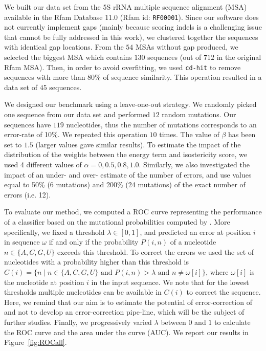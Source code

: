 We built our data set from the 5S rRNA multiple sequence alignment (MSA) available in the Rfam Database 11.0 (Rfam id: \texttt{RF00001}).
Since our software does not currently implement gaps (mainly because scoring indels is a challenging issue that cannot be fully addressed
in this work),  we clustered together the sequences with identical gap locations. From the $54$ MSAs without gap produced, we selected the
biggest MSA  which contains $130$ sequences (out of $712$ in the original Rfam MSA). Then, in order to avoid overfitting, we used \texttt{cd-hit}
\cite{Li:2006fk} to remove sequences with more than 80\% of sequence similarity. This operation resulted in a data set of $45$ sequences. 

We designed our benchmark using a leave-one-out strategy. We randomly picked one sequence from our data set and performed $12$ random
mutations. Our sequences have $119$ nucleotides, thus the number of mutations corresponds to an error-rate of 10\%. We repeated this operation 
$10$ times. The value of $\beta$ has been set to $1.5$ (larger values gave similar results). To estimate the impact of the distribution of the weights
between the energy term and isostericity  score, we used 4 different values of $\alpha = {0, 0.5, 0.8, 1.0}$. Similarly, we also investigated the impact of 
an under- and over- estimate of the number of errors, and use values equal to 50\% (6 mutations) and 200\% (24 mutations) of the exact number of
errors (i.e. 12).

To evaluate our method, we computed a ROC curve representing the performance of a classifier based on the mutational probabilities computed
by \RNApyro. More specifically, we fixed a threshold $\lambda \in [0,1]$, and predicted an error at position $i$ in sequence $\omega$ if and only if the
probability $P(i,n)$ of a nucleotide $n \in \{ A,C,G,U \}$ exceeds this threshold. To correct the errors we used the set of nucleotides with a probability
higher than this threshold is  $C(i) = \{ n \; | \;  n \in \{ A,C,G,U \} \mbox{ and } P(i,n) > \lambda \mbox{ and }  n \neq \omega[i] \}$, where $\omega[i]$ is
the nucleotide at position $i$ in the input sequence. We note that for the lowest thresholds multiple nucleotides can be available in $C(i)$ to correct
the sequence. Here, we remind that our aim is to estimate the potential of error-correction of \RNApyro and not to develop an error-correction pipe-line, which  
will be the subject of further studies. Finally, we progressively varied $\lambda$ between $0$ and $1$ to calculate the ROC curve and the area
under the curve (AUC). We report our results in Figure~\ref{fig:ROCall}. 

